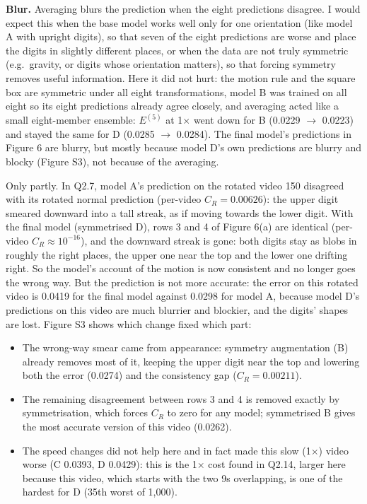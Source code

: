\textbf{Blur.} Averaging blurs the prediction when the eight predictions disagree. I would expect this when the base model works well only for one orientation (like model A with upright digits), so that seven of the eight predictions are worse and place the digits in slightly different places, or when the data are not truly symmetric (e.g.\ gravity, or digits whose orientation matters), so that forcing symmetry removes useful information. Here it did not hurt: the motion rule and the square box are symmetric under all eight transformations, model B was trained on all eight so its eight predictions already agree closely, and averaging acted like a small eight-member ensemble: $E^{(5)}$ at 1$\times$ went down for B (0.0229 $\to$ 0.0223) and stayed the same for D (0.0285 $\to$ 0.0284). The final model's predictions in Figure 6 are blurry, but mostly because model D's own predictions are blurry and blocky (Figure S3), not because of the averaging.

Only partly. In Q2.7, model A's prediction on the rotated video 150 disagreed with its rotated normal prediction (per-video $C_R=0.00626$): the upper digit smeared downward into a tall streak, as if moving towards the lower digit. With the final model (symmetrised D), rows 3 and 4 of Figure 6(a) are identical (per-video $C_R\approx10^{-16}$), and the downward streak is gone: both digits stay as blobs in roughly the right places, the upper one near the top and the lower one drifting right. So the model's account of the motion is now consistent and no longer goes the wrong way. But the prediction is not more accurate: the error on this rotated video is 0.0419 for the final model against 0.0298 for model A, because model D's predictions on this video are much blurrier and blockier, and the digits' shapes are lost. Figure S3 shows which change fixed which part:
\begin{itemize}
\item The wrong-way smear came from appearance: symmetry augmentation (B) already removes most of it, keeping the upper digit near the top and lowering both the error (0.0274) and the consistency gap ($C_R=0.00211$).
\item The remaining disagreement between rows 3 and 4 is removed exactly by symmetrisation, which forces $C_R$ to zero for any model; symmetrised B gives the most accurate version of this video (0.0262).
\item The speed changes did not help here and in fact made this slow (1$\times$) video worse (C 0.0393, D 0.0429): this is the 1$\times$ cost found in Q2.14, larger here because this video, which starts with the two 9s overlapping, is one of the hardest for D (35th worst of 1,000).
\end{itemize}

